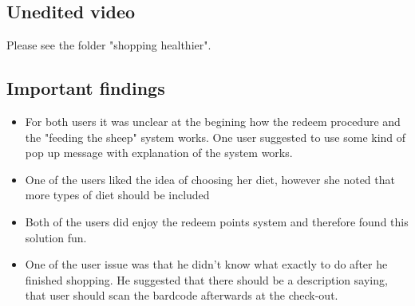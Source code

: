 \subsection{Unedited video}
Please see the folder "shopping healthier".

\subsection{Important findings}
\begin{itemize}
 \item For both users it was unclear at the begining how the redeem procedure and  the "feeding the sheep" system
works. One user suggested to use some kind of pop up message with explanation of the system works.
 \item One of the users liked the idea of choosing her diet, however she noted that more types of diet should be included
 \item Both of the users did enjoy the redeem points system and therefore found this solution fun.
 \item One of the user issue was that he didn't know what exactly to do after he finished shopping. He suggested that there should be a description saying, that user should scan the bardcode afterwards at the check-out.
 \end{itemize}
